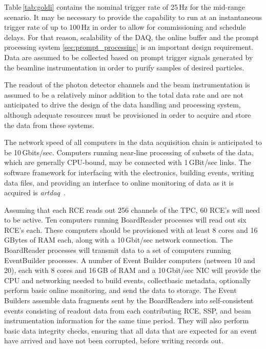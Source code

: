 

Table\,\ref{tab:goldi} contains the nominal trigger rate of 25\,Hz for
the mid-range scenario. It may be necessary to provide the capability
to run at  an instantaneous trigger rate of up to 100\,Hz in order to
allow for commissioning and schedule delays. For that reason,
scalability of the DAQ, the online buffer and the prompt processing system
\ref{sec:prompt_processing} is an important design requirement.
 Data are assumed to be
collected based on prompt trigger signals generated by the beamline
instrumentation in order to purify samples of desired particles.

The readout of the photon detector channels and the beam
instrumentation is assumed to be a relatively minor addition to the
total data rate and are not anticipated to drive the design of the
data handling and processing system, although adequate resources must
be provisioned in order to acquire and store the data from these
systems.

The network speed of all computers in the data acquisition
chain is anticipated to be 10\,Gbits/sec.  Computers running near-line
processing of subsets of the data, which are generally CPU-bound, may
be connected with 1\,GBit/sec links.  The software framework for
interfacing with the electronics, building events, writing data files,
and providing an interface to online monitoring of data as it is
acquired is {\it artdaq}~\cite{artdaq}.

Assuming that each RCE reads out 256 channels of the TPC, 60 RCE's
will need to be active.  Ten computers running BoardReader
processes will read out six RCE's each.  These computers should be
provisioned with at least 8 cores and 16 GBytes of RAM each, along
with a 10\,Gbit/sec network connection.  The BoardReader processes will
transmit data to a set of computers running EventBuilder processes.
A number of Event Builder computers (netween 10 and 20), each with 8 cores and 16\,GB of RAM
and a 10\,Gbit/sec NIC will provide the CPU and networking needed to
build events, collectbasic metadata, optionally perform basic online monitoring,
and send the data to storage.  The Event Builders assemble data fragments sent by the
BoardReaders into self-consistent events consisting of readout data
from each contributing RCE, SSP, and beam instrumentation information
for the same time period.  They will also perform basic data integrity
checks, ensuring that all data that are expected for an event have
arrived and have not been corrupted, before writing records out.

